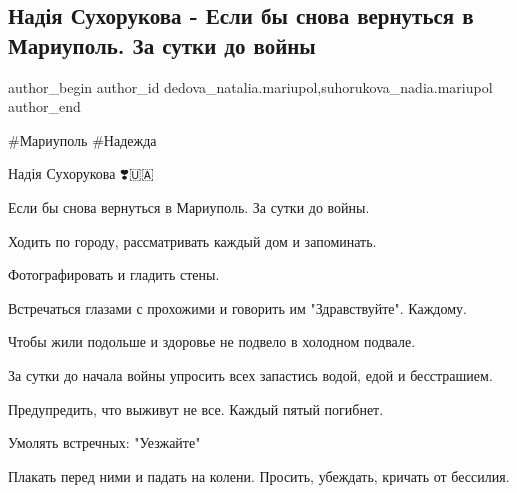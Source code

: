  
 
 
 
 

\subsection{Надія Сухорукова - Если бы снова вернуться в Мариуполь.  За сутки  до войны}
\label{sec:06_09_2022.fb.dedova_natalia.mariupol.1.suhorukova_esli_by_snova_vernutsja_v_mariupol_za_sutki_do_vojny}
 
\ifcmt
 author_begin
   author_id dedova_natalia.mariupol,suhorukova_nadia.mariupol
 author_end
\fi

\#Мариуполь \#Надежда

Надія Сухорукова ❣️🇺🇦

Если бы снова вернуться в Мариуполь.  За сутки  до войны. 


Ходить  по городу, рассматривать каждый дом и запоминать.  

Фотографировать и гладить стены. 

Встречаться глазами с прохожими и говорить им "Здравствуйте". Каждому. 

Чтобы жили подольше и здоровье не подвело в холодном подвале. 

За сутки до начала войны упросить   всех  запастись  водой, едой и бесстрашием. 

Предупредить, что выживут не все. Каждый пятый погибнет. 

Умолять встречных: "Уезжайте" 

Плакать перед ними и падать на колени.  Просить,   убеждать, кричать от
бессилия.

